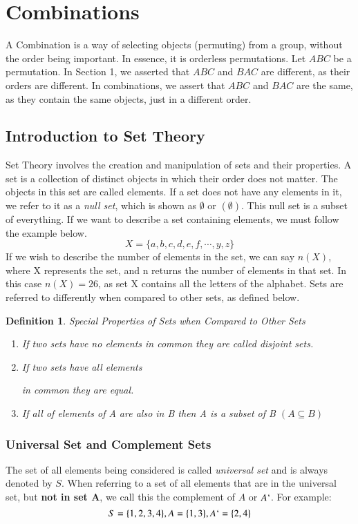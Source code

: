 \documentclass[final,1p,12pt]{elsarticle}
\newtheorem{definition}{Definition}
\begin{document}
\section{Combinations}
A Combination is a way of selecting objects (permuting) from a group, without the order being important. In essence, it is orderless permutations. Let $ABC$ be a permutation. In Section 1, we asserted that $ABC$ and $BAC$ are different, as their orders are different. In combinations, we assert that $ABC$ and $BAC$ are the same, as they contain the same objects, just in a different order.

    \subsection{Introduction to Set Theory}
    Set Theory involves the creation and manipulation of sets and their properties. A set is a collection of distinct objects in which their order does not matter. The objects in this set are called elements. If a set does not have any elements in it, we refer to it as a \emph{null set}, which is shown as $\emptyset$ or $(\emptyset)$. This null set is a subset of everything. If we want to describe a set containing elements, we must follow the example below.
    \[X = \{a,b,c,d,e,f,\cdots,y,z\}\] 
    If we wish to describe the number of elements in the set, we can say $n(X)$, where X represents the set, and n returns the number of elements in that set. In this case $n(X) = 26$, as set X contains all the letters of the alphabet. Sets are referred to differently when compared to other sets, as defined below.
    \begin{definition}
    Special Properties of Sets when Compared to Other Sets
    \begin{enumerate}
        \item If two sets have no elements in common they are called disjoint sets.
        \item If two sets have all elements 
        
        
        
        in common they are equal.
        \item If all of elements of A are also in B then A is a subset of B $(A\subseteq B)$
    \end{enumerate}
    \end{definition}
    \subsubsection{Universal Set and Complement Sets}
    The set of all elements being considered is called \emph{universal set} and is always denoted by $S$. When referring to a set of all elements that are in the universal set, but \textbf{not in set A}, we call this the complement of $A$ or $A`$. For example: 
    \[S = \{1,2,3,4\}, A = \{1,3\}, A`=\{2,4\}\]
\end{document}
